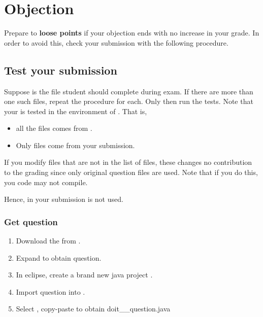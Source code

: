\section{Objection}

Prepare to \textbf{loose points} 
if your objection ends with no increase in your grade. 
In order to avoid this,
check your submission with the following procedure.




\subsection{Test your submission}

Suppose  is the file student should complete during exam. 
If there are more than one such files, repeat the procedure for each. 
Only then run the tests.
Note that your  is tested in the environment of . 
That is,
\begin{itemize}[nosep] 
	
	\item all the files comes from .
	
	\item Only  files come from your submission.
	
\end{itemize}
If you modify files that are not in the list of  files, 
these changes no contribution to the grading 
since only original question files are used. 
Note that if you do this, 
you code may not compile.

Hence,  in your submission is not used.




\subsubsection{Get question}

\begin{enumerate}[label=\roman*.]
	
	\item Download the  from \YULearn.
	\item Expand  to obtain question.
	\item In eclipse, create a brand new java project .
	\item Import question into .
	\item Select , copy-paste to obtain doit\_\_question.java
	
\end{enumerate}




